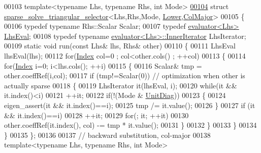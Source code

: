 \begin{DoxyCode}
00103 \textcolor{keyword}{template}<\textcolor{keyword}{typename} Lhs, \textcolor{keyword}{typename} Rhs, \textcolor{keywordtype}{int} Mode>
\hyperlink{struct_eigen_1_1internal_1_1sparse__solve__triangular__selector_3_01_lhs_00_01_rhs_00_01_mode_00_01_lower_00_01_col_major_01_4}{00104} \textcolor{keyword}{struct }\hyperlink{struct_eigen_1_1internal_1_1sparse__solve__triangular__selector}{sparse\_solve\_triangular\_selector}<Lhs,Rhs,Mode,
      \hyperlink{group__enums_gga39e3366ff5554d731e7dc8bb642f83cda891792b8ed394f7607ab16dd716f60e6}{Lower},\hyperlink{group__enums_ggaacded1a18ae58b0f554751f6cdf9eb13a0cbd4bdd0abcfc0224c5fcb5e4f6669a}{ColMajor}>
00105 \{
00106   \textcolor{keyword}{typedef} \textcolor{keyword}{typename} Rhs::Scalar Scalar;
00107   \textcolor{keyword}{typedef} \hyperlink{struct_eigen_1_1internal_1_1evaluator}{evaluator<Lhs>} \hyperlink{struct_eigen_1_1internal_1_1evaluator}{LhsEval};
00108   \textcolor{keyword}{typedef} \textcolor{keyword}{typename} \hyperlink{struct_eigen_1_1internal_1_1evaluator}{evaluator<Lhs>::InnerIterator} LhsIterator;
00109   \textcolor{keyword}{static} \textcolor{keywordtype}{void} run(\textcolor{keyword}{const} Lhs& lhs, Rhs& other)
00110   \{
00111     LhsEval lhsEval(lhs);
00112     \textcolor{keywordflow}{for}(\hyperlink{namespace_eigen_a62e77e0933482dafde8fe197d9a2cfde}{Index} col=0 ; col<other.cols() ; ++col)
00113     \{
00114       \textcolor{keywordflow}{for}(\hyperlink{namespace_eigen_a62e77e0933482dafde8fe197d9a2cfde}{Index} i=0; i<lhs.cols(); ++i)
00115       \{
00116         Scalar& tmp = other.coeffRef(i,col);
00117         \textcolor{keywordflow}{if} (tmp!=Scalar(0)) \textcolor{comment}{// optimization when other is actually sparse}
00118         \{
00119           LhsIterator it(lhsEval, i);
00120           \textcolor{keywordflow}{while}(it && it.index()<i)
00121             ++it;
00122           \textcolor{keywordflow}{if}(!(Mode & \hyperlink{group__enums_gga39e3366ff5554d731e7dc8bb642f83cdaddb72f888ac85d5a1c52333e54f9374b}{UnitDiag}))
00123           \{
00124             eigen\_assert(it && it.index()==i);
00125             tmp /= it.value();
00126           \}
00127           \textcolor{keywordflow}{if} (it && it.index()==i)
00128             ++it;
00129           \textcolor{keywordflow}{for}(; it; ++it)
00130             other.coeffRef(it.index(), col) -= tmp * it.value();
00131         \}
00132       \}
00133     \}
00134   \}
00135 \};
00136 
00137 \textcolor{comment}{// backward substitution, col-major}
00138 \textcolor{keyword}{template}<\textcolor{keyword}{typename} Lhs, \textcolor{keyword}{typename} Rhs, \textcolor{keywordtype}{int} Mode>

\end{DoxyCode}
